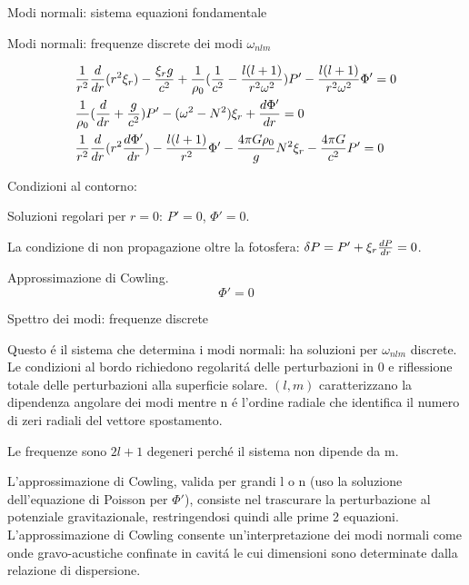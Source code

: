 \documentclass[10pt,xcolor={usenames},fleqn,mathserif,serif]{beamer}
\begin{document}
\begin{frame}{Modi normali: sistema equazioni fondamentale}

\begin{block}{Modi normali: frequenze discrete dei modi $\omega_{nlm}$}

\begin{subequations}%
\begin{align*}
&\frac{1}{r^2}\TDof{r}(r^2\xi_r)-\frac{\xi_rg}{c^2}+\frac{1}{\rho_0}(\frac{1}{c^2}-\frac{l(l+1)}{r^2\omega^2})P'-\frac{l(l+1)}{r^2\omega^2}\Phi'=0\\
&\frac{1}{\rho_0}(\TDof{r}+\frac{g}{c^2})P'-(\omega^2-N^2)\xi_r+\TDy{r}{\Phi'}=0\\
&\frac{1}{r^2}\TDof{r}(r^2\TDy{r}{\Phi'})-\frac{l(l+1)}{r^2}\Phi'-\frac{4\pi G\rho_0}{g}N^2\xi_r-\frac{4\pi G}{c^2}P'=0
\end{align*}
\end{subequations}

Condizioni al contorno:

Soluzioni regolari per $r=0$: $P'=0$, $\Phi'=0$.

La condizione di non propagazione oltre la fotosfera: $\Lvar{P}=P'+\xi_r\TDy{r}{P}=0$.

\end{block}

\begin{block}{Approssimazione di Cowling.}
\[\Phi'=0\]
\end{block}

\end{frame}

\begin{wordonframe}{Spettro dei modi: frequenze discrete}

Questo \'e il sistema che determina i modi normali: ha soluzioni per $\omega_{nlm}$ discrete. Le condizioni al bordo richiedono regolarit\'a delle perturbazioni in 0 e riflessione totale delle perturbazioni alla superficie solare. $(l,m)$ caratterizzano la dipendenza angolare dei modi mentre n \'e l'ordine radiale che identifica il numero di zeri radiali del vettore spostamento.

Le frequenze sono $2l+1$ degeneri perch\'e il sistema non dipende da m.

L'approssimazione di Cowling, valida per grandi l o n (uso la soluzione dell'equazione di Poisson per $\Phi'$), consiste nel trascurare la perturbazione al potenziale gravitazionale, restringendosi quindi alle prime 2 equazioni. L'approssimazione di Cowling consente un'interpretazione dei modi normali come onde gravo-acustiche confinate in cavit\'a le cui dimensioni sono determinate dalla relazione di dispersione.

\end{wordonframe}
\end{document}
